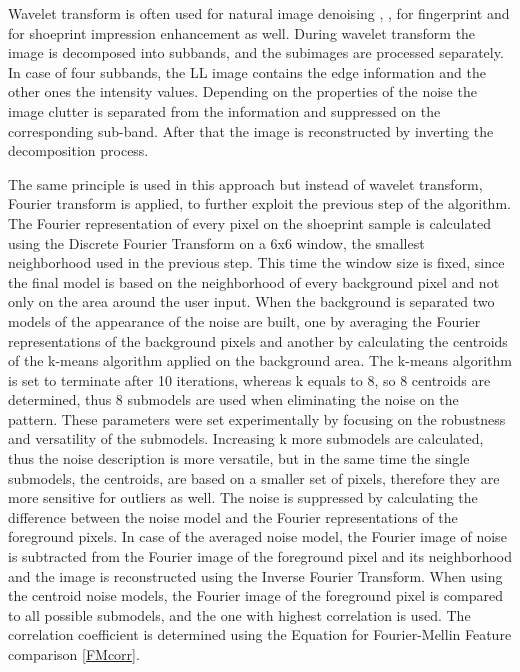 \documentclass[draft,final]{vutinfth} %
\begin{document}
Wavelet transform is often used for natural image denoising \cite{xu2016image}, \cite{sugamya2016image}, for fingerprint \cite{li2012texture} and for shoeprint impression enhancement \cite{katireddy2017novel} as well.
During wavelet transform the image is decomposed into subbands, and the subimages are processed separately.
In case of four subbands, the LL image contains the edge information and the other ones the intensity values.
Depending on the properties of the noise the image clutter is separated from the information and suppressed on the corresponding sub-band.
After that the image is reconstructed by inverting the decomposition process.
\par
The same principle is used in this approach but instead of wavelet transform, Fourier transform is applied, to further exploit the previous step of the algorithm.
The Fourier representation of every pixel on the shoeprint sample is calculated using the Discrete Fourier Transform on a 6x6 window, the smallest neighborhood used in the previous step.
This time the window size is fixed, since the final model is based on the neighborhood of every background pixel and not only on the area around the user input.
When the background is separated two models of the appearance of the noise are built, one by averaging the Fourier representations of the background pixels and another by calculating the centroids of the k-means algorithm applied on the background area.
The k-means algorithm is set to terminate after 10 iterations, whereas k equals to 8, so 8 centroids are determined, thus 8 submodels are used when eliminating the noise on the pattern.
These parameters were set experimentally by focusing on the robustness and versatility of the submodels.
Increasing k more submodels are calculated, thus the noise description is more versatile, but in the same time the single submodels, the centroids, are based on a smaller set of pixels, therefore they are more sensitive for outliers as well. 
The noise is suppressed by calculating the difference between the noise model and the Fourier representations of the foreground pixels.
In case of the averaged noise model, the Fourier image of noise is subtracted from the Fourier image of the foreground pixel and its neighborhood and the image is reconstructed using the Inverse Fourier Transform.
When using the centroid noise models, the Fourier image of the foreground pixel is compared to all possible submodels, and the one with highest correlation is used.
The correlation coefficient is determined using the Equation for Fourier-Mellin Feature comparison \ref{FMcorr}.
\end{document}
